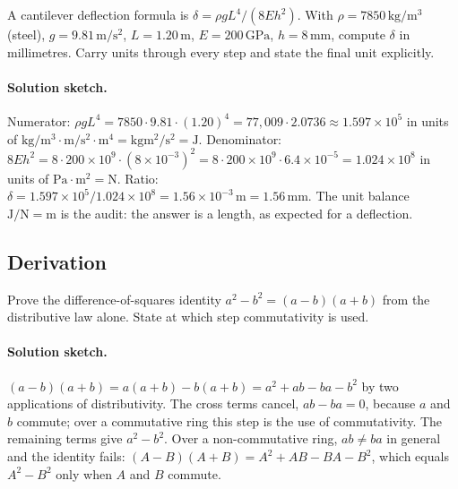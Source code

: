 \begin{exercise}
A cantilever deflection formula is $\delta = \rho g L^{4} / (8 E
h^{2})$. With $\rho = 7850 \,\si{\kilogram\per\meter\cubed}$ (steel),
$g = 9.81 \,\si{\meter\per\second\squared}$, $L = 1.20 \,\si{\meter}$,
$E = 200 \,\si{\giga\pascal}$, $h = 8 \,\si{\milli\meter}$, compute
$\delta$ in millimetres. Carry units through every step and state
the final unit explicitly.

\paragraph{Solution sketch.}
Numerator: $\rho g L^{4} = 7850 \cdot 9.81 \cdot (1.20)^{4} =
77{,}009 \cdot 2.0736 \approx 1.597 \times 10^{5}$ in units of
$\si{\kilogram\per\meter\cubed} \cdot \si{\meter\per\second\squared}
\cdot \si{\meter\tothe{4}} = \si{\kilogram\meter\squared\per\second
\squared} = \si{\joule}$.
Denominator: $8 E h^{2} = 8 \cdot 200 \times 10^{9} \cdot (8 \times
10^{-3})^{2} = 8 \cdot 200 \times 10^{9} \cdot 6.4 \times 10^{-5} =
1.024 \times 10^{8}$ in units of $\si{\pascal} \cdot \si{\meter
\squared} = \si{\newton}$.
Ratio: $\delta = 1.597 \times 10^{5} / 1.024 \times 10^{8} = 1.56
\times 10^{-3} \,\si{\meter} = 1.56 \,\si{\milli\meter}$.
The unit balance $\si{\joule}/\si{\newton} = \si{\meter}$ is the
audit: the answer is a length, as expected for a deflection.
\end{exercise}

\subsection*{Derivation}

\begin{exercise}
Prove the difference-of-squares identity $a^{2} - b^{2} = (a -
b)(a + b)$ from the distributive law alone. State at which step
commutativity is used.

\paragraph{Solution sketch.}
$(a - b)(a + b) = a(a + b) - b(a + b) = a^{2} + ab - ba - b^{2}$ by
two applications of distributivity. The cross terms cancel,
$ab - ba = 0$, because $a$ and $b$ commute; over a commutative ring
this step is the use of commutativity. The remaining terms give
$a^{2} - b^{2}$. Over a non-commutative ring, $ab \neq ba$ in
general and the identity fails: $(A - B)(A + B) = A^{2} + AB - BA -
B^{2}$, which equals $A^{2} - B^{2}$ only when $A$ and $B$ commute.
\end{exercise}

